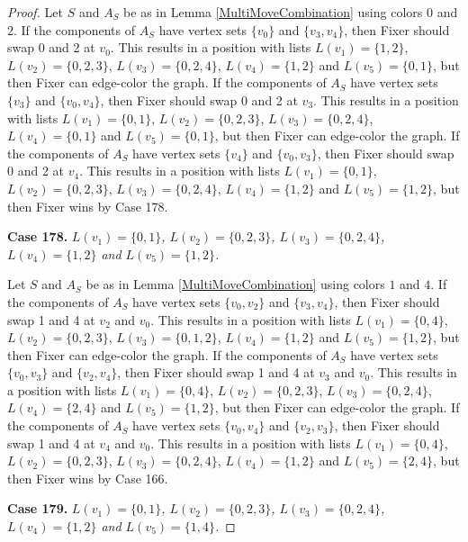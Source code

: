 \documentclass[12pt]{amsart}
\theoremstyle{plain}
\theoremstyle{definition}
\theoremstyle{remark}
\begin{document}
\begin{proof}
Let $S$ and $A_S$ be as in Lemma \ref{MultiMoveCombination} using colors $0$ and $2$. If the components of $A_S$ have vertex sets $\{v_0\}$ and $\{v_3, v_4\}$, then Fixer should swap 0 and 2 at $v_0$. This results in a position with lists $L(v_1) = \{1, 2\}$, $L(v_2) = \{0, 2, 3\}$, $L(v_3) = \{0, 2, 4\}$, $L(v_4) = \{1, 2\}$ and $L(v_5) = \{0, 1\}$, but then Fixer can edge-color the graph.
If the components of $A_S$ have vertex sets $\{v_3\}$ and $\{v_0, v_4\}$, then Fixer should swap 0 and 2 at $v_3$. This results in a position with lists $L(v_1) = \{0, 1\}$, $L(v_2) = \{0, 2, 3\}$, $L(v_3) = \{0, 2, 4\}$, $L(v_4) = \{0, 1\}$ and $L(v_5) = \{0, 1\}$, but then Fixer can edge-color the graph.
If the components of $A_S$ have vertex sets $\{v_4\}$ and $\{v_0, v_3\}$, then Fixer should swap 0 and 2 at $v_4$. This results in a position with lists $L(v_1) = \{0, 1\}$, $L(v_2) = \{0, 2, 3\}$, $L(v_3) = \{0, 2, 4\}$, $L(v_4) = \{1, 2\}$ and $L(v_5) = \{1, 2\}$, but then Fixer wins by Case 178.

\noindent\textbf{Case 178.  }\textit{$L(v_1) = \{0, 1\}$, $L(v_2) = \{0, 2, 3\}$, $L(v_3) = \{0, 2, 4\}$, $L(v_4) = \{1, 2\}$ and $L(v_5) = \{1, 2\}$.}

Let $S$ and $A_S$ be as in Lemma \ref{MultiMoveCombination} using colors $1$ and $4$. If the components of $A_S$ have vertex sets $\{v_0, v_2\}$ and $\{v_3, v_4\}$, then Fixer should swap 1 and 4 at $v_2$ and $v_0$. This results in a position with lists $L(v_1) = \{0, 4\}$, $L(v_2) = \{0, 2, 3\}$, $L(v_3) = \{0, 1, 2\}$, $L(v_4) = \{1, 2\}$ and $L(v_5) = \{1, 2\}$, but then Fixer can edge-color the graph.
If the components of $A_S$ have vertex sets $\{v_0, v_3\}$ and $\{v_2, v_4\}$, then Fixer should swap 1 and 4 at $v_3$ and $v_0$. This results in a position with lists $L(v_1) = \{0, 4\}$, $L(v_2) = \{0, 2, 3\}$, $L(v_3) = \{0, 2, 4\}$, $L(v_4) = \{2, 4\}$ and $L(v_5) = \{1, 2\}$, but then Fixer can edge-color the graph.
If the components of $A_S$ have vertex sets $\{v_0, v_4\}$ and $\{v_2, v_3\}$, then Fixer should swap 1 and 4 at $v_4$ and $v_0$. This results in a position with lists $L(v_1) = \{0, 4\}$, $L(v_2) = \{0, 2, 3\}$, $L(v_3) = \{0, 2, 4\}$, $L(v_4) = \{1, 2\}$ and $L(v_5) = \{2, 4\}$, but then Fixer wins by Case 166.

\noindent\textbf{Case 179.  }\textit{$L(v_1) = \{0, 1\}$, $L(v_2) = \{0, 2, 3\}$, $L(v_3) = \{0, 2, 4\}$, $L(v_4) = \{1, 2\}$ and $L(v_5) = \{1, 4\}$.}


\end{proof}
\end{document}
